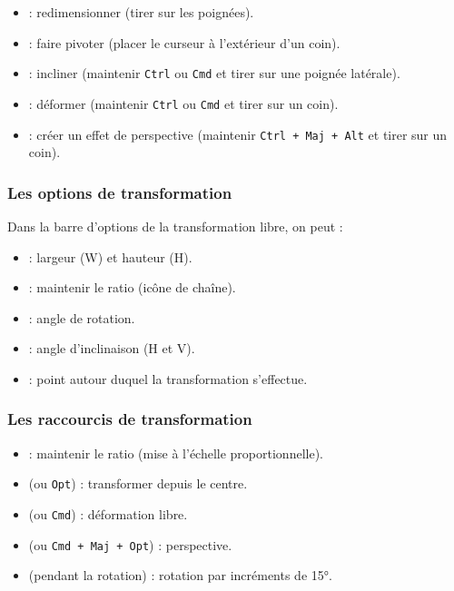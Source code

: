 \begin{itemize}
    \item {} : redimensionner (tirer sur les poignées).
    \item {} : faire pivoter (placer le curseur à l'extérieur d'un coin).
    \item {} : incliner (maintenir \texttt{Ctrl} ou \texttt{Cmd} et tirer sur une poignée latérale).
    \item {} : déformer (maintenir \texttt{Ctrl} ou \texttt{Cmd} et tirer sur un coin).
    \item {} : créer un effet de perspective (maintenir \texttt{Ctrl + Maj + Alt} et tirer sur un coin).
\end{itemize}

\subsubsection{Les options de transformation}

Dans la barre d'options de la transformation libre, on peut :

\begin{itemize}
    \item {} : largeur (W) et hauteur (H).
    \item {} : maintenir le ratio (icône de chaîne).
    \item {} : angle de rotation.
    \item {} : angle d'inclinaison (H et V).
    \item {} : point autour duquel la transformation s'effectue.
\end{itemize}

\subsubsection{Les raccourcis de transformation}

\begin{itemize}
    \item {} : maintenir le ratio (mise à l'échelle proportionnelle).
    \item {} (ou \texttt{Opt}) : transformer depuis le centre.
    \item {} (ou \texttt{Cmd}) : déformation libre.
    \item {} (ou \texttt{Cmd + Maj + Opt}) : perspective.
    \item {} (pendant la rotation) : rotation par incréments de 15°.
\end{itemize}

